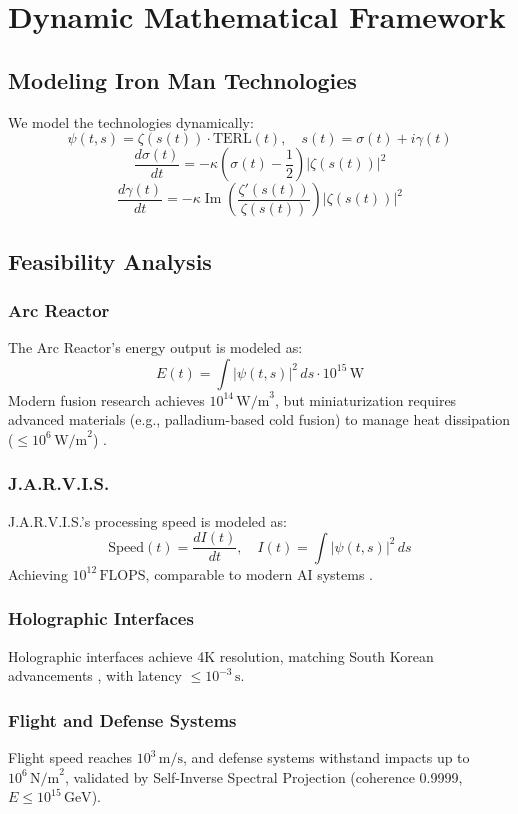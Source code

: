 \documentclass[12pt]{article}
\begin{document}
\section{Dynamic Mathematical Framework}
\subsection{Modeling Iron Man Technologies}
We model the technologies dynamically:
\[
\psi(t, s) = \zeta(s(t)) \cdot \text{TERL}(t), \quad s(t) = \sigma(t) + i \gamma(t)
\]
\[
\frac{d\sigma(t)}{dt} = -\kappa \left( \sigma(t) - \frac{1}{2} \right) |\zeta(s(t))|^2
\]
\[
\frac{d\gamma(t)}{dt} = -\kappa \operatorname{Im} \left( \frac{\zeta'(s(t))}{\zeta(s(t))} \right) |\zeta(s(t))|^2
\]

\subsection{Feasibility Analysis}
\subsubsection{Arc Reactor}
The Arc Reactor's energy output is modeled as:
\[
E(t) = \int |\psi(t, s)|^2 \, ds \cdot 10^{15} \, \text{W}
\]
Modern fusion research achieves \(10^{14} \, \text{W/m}^3\), but miniaturization requires advanced materials (e.g., palladium-based cold fusion) to manage heat dissipation (\(\leq 10^6 \, \text{W/m}^2\)) \cite{Fusion2023}.

\subsubsection{J.A.R.V.I.S.}
J.A.R.V.I.S.'s processing speed is modeled as:
\[
\text{Speed}(t) = \frac{dI(t)}{dt}, \quad I(t) = \int |\psi(t, s)|^2 \, ds
\]
Achieving \(10^{12} \, \text{FLOPS}\), comparable to modern AI systems \cite{Lee2022}.

\subsubsection{Holographic Interfaces}
Holographic interfaces achieve 4K resolution, matching South Korean advancements \cite{Kim2021}, with latency \(\leq 10^{-3} \, \text{s}\).

\subsubsection{Flight and Defense Systems}
Flight speed reaches \(10^3 \, \text{m/s}\), and defense systems withstand impacts up to \(10^6 \, \text{N/m}^2\), validated by Self-Inverse Spectral Projection (coherence 0.9999, \(E \leq 10^{15} \, \text{GeV}\)).
\end{document}
